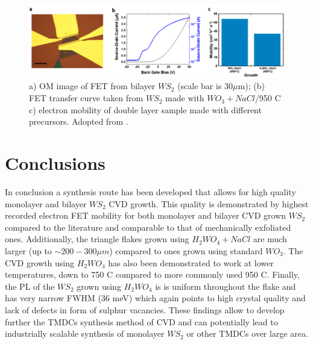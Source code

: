 \begin{figure}[h]
	\begin{center}
		\includegraphics[scale=0.4]{PaperElectricalMeasurementBilayer.png}
		\caption{a) OM image of FET from bilayer $WS_2$ (scale bar is 30$\mu$m); (b) FET transfer curve taken from $WS_2$ made with $WO_3+NaCl$/950 {\degree}C c) electron mobility of double layer sample made with different precursors. Adopted from \cite{Reale2017}.}
		\label{fig:PaperElectricalMeasurementBilayer}
	\end{center}
\end{figure}

\section{Conclusions}

In conclusion a synthesis route has been developed that allows for high quality monolayer and bilayer $WS_2$ CVD growth. This quality is demonstrated by highest recorded electron FET mobility for both monolayer and bilayer CVD grown $WS_2$ compared to the literature and comparable to that of mechanically exfoliated ones. Additionally, the triangle flakes grown using $H_2WO_4 + NaCl$ are much larger (up to $\sim 200-300 {\mu}m$) compared to ones grown using standard $WO_3$. The CVD growth using $H_2WO_4$ has also been demonstrated to work at lower temperatures, down to 750 {\degree}C compared to more commonly used 950 {\degree}C. Finally, the PL of the $WS_2$ grown using $H_2WO_4$ is is uniform throughout the flake and has very narrow FWHM (36 meV) which again points to high crystal quality and lack of defects in form of sulphur vacancies. These findings allow to develop further the TMDCs synthesis method of CVD and can potentially lead to industrially scalable synthesis of monolayer $WS_2$ or other TMDCs over large area.
